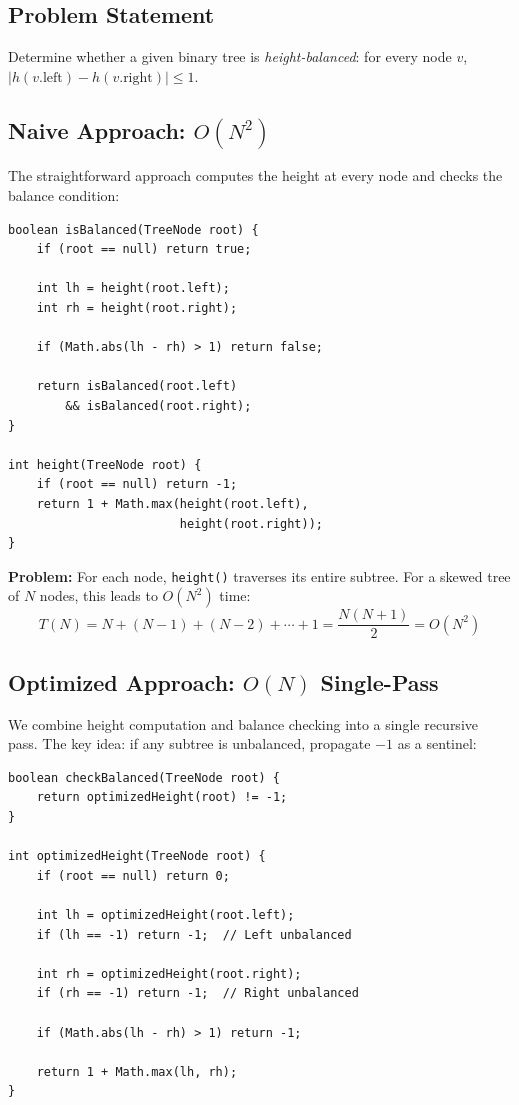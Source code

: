 \documentclass[10pt,journal,compsoc,onecolumn]{IEEEtran}
\begin{document}
\subsection{Problem Statement}

Determine whether a given binary tree is \emph{height-balanced}: for every node $v$, $|h(v.\text{left}) - h(v.\text{right})| \leq 1$.

\subsection{Naive Approach: $O(N^2)$}

The straightforward approach computes the height at every node and checks the balance condition:

\begin{verbatim}
boolean isBalanced(TreeNode root) {
    if (root == null) return true;
    
    int lh = height(root.left);
    int rh = height(root.right);
    
    if (Math.abs(lh - rh) > 1) return false;
    
    return isBalanced(root.left) 
        && isBalanced(root.right);
}

int height(TreeNode root) {
    if (root == null) return -1;
    return 1 + Math.max(height(root.left), 
                        height(root.right));
}
\end{verbatim}

\textbf{Problem:} For each node, \texttt{height()} traverses its entire subtree. For a skewed tree of $N$ nodes, this leads to $O(N^2)$ time:
\[
T(N) = N + (N-1) + (N-2) + \cdots + 1 = \frac{N(N+1)}{2} = O(N^2)
\]

\subsection{Optimized Approach: $O(N)$ Single-Pass}

We combine height computation and balance checking into a single recursive pass. The key idea: if any subtree is unbalanced, propagate $-1$ as a sentinel:

\begin{verbatim}
boolean checkBalanced(TreeNode root) {
    return optimizedHeight(root) != -1;
}

int optimizedHeight(TreeNode root) {
    if (root == null) return 0;
    
    int lh = optimizedHeight(root.left);
    if (lh == -1) return -1;  // Left unbalanced
    
    int rh = optimizedHeight(root.right);
    if (rh == -1) return -1;  // Right unbalanced
    
    if (Math.abs(lh - rh) > 1) return -1;
    
    return 1 + Math.max(lh, rh);
}
\end{verbatim}
\end{document}

